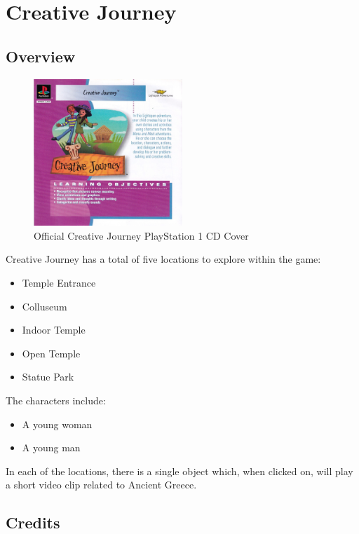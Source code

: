 \chapter{Creative Journey}

\section{Overview}

\begin{figure}[H]
    \centering
    \includegraphics[width=0.5\textwidth]{"./Games/Creative/Images/CreativeJourneyCDCover.jpg"}
    \caption{Official Creative Journey PlayStation 1 CD Cover}
\end{figure}

Creative Journey has a total of five locations to explore within the game:

\begin{itemize}
    \item Temple Entrance
    \item Colluseum
    \item Indoor Temple
    \item Open Temple
    \item Statue Park
\end{itemize}

The characters include:
\begin{itemize}
    \item A young woman
    \item A young man
\end{itemize}

In each of the locations, there is a single object which, when clicked on, will play a short video clip related to Ancient Greece.

\section{Credits}

